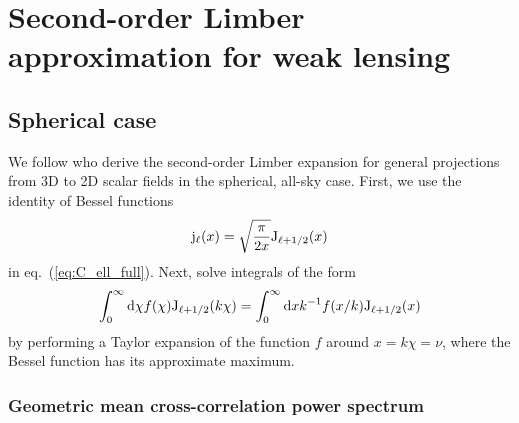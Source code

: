 \documentclass[useAMS,usenatbib]{mn2e} %
\begin{document}
\section{Second-order Limber approximation for weak lensing}
\label{sec:L2}

\subsection{Spherical case}

We follow \cite{2008PhRvD..78l3506L} who derive the second-order Limber
expansion for general projections from 3D to 2D scalar fields in the spherical,
all-sky case. First, we use the identity of Bessel functions
%
\begin{equation}
  {\rm j}_\ell(x) = \sqrt{\frac{\pi}{2x}} {\rm J}_{\ell + 1/2}(x)
\end{equation}
%
in eq.~(\ref{eq:C_ell_full}). Next, \cite{2008PhRvD..78l3506L} solve
integrals of the form
%
\begin{equation}
  \int_0^\infty {\rm d} \chi f(\chi) {\rm J}_{\ell + 1/2}(k \chi)
  = \int_0^\infty {\rm d} x k^{-1} f(x/k) {\rm J}_{\ell + 1/2}(x)
  \label{eq:int_dchi}
\end{equation}
%
by performing a Taylor expansion of the function $f$ around $x = k \chi = \nu$, where
the Bessel function has its approximate maximum.

\subsubsection{Geometric mean cross-correlation power spectrum}
\end{document}
